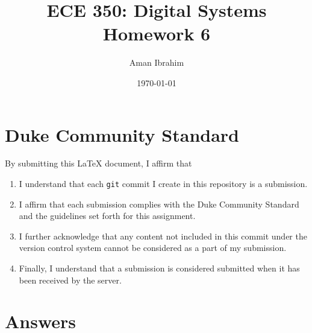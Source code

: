 \documentclass[letterpaper]{article} %
\begin{document}
\title{ECE 350: Digital Systems Homework 6}
\author{Aman Ibrahim} %
\date{\today} %
\maketitle

\section*{Duke Community Standard}

By submitting this \LaTeX{} document, I affirm that
\begin{enumerate}
    \item I understand that each \texttt{git} commit I create in this repository is a submission.
    \item I affirm that each submission complies with the Duke Community Standard and the guidelines set forth for this assignment.
    \item I further acknowledge that any content not included in this commit under the version control system cannot be considered as a part of my submission.
    \item Finally, I understand that a submission is considered submitted when it has been received by the server.
\end{enumerate}

\newpage

\section{Answers}
\end{document}
